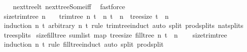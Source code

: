 \begin{isabellebody}
%
\isadelimproof
\ \ %
\endisadelimproof
%
\isatagproof
{}\isamarkupfalse%
\ next{\isacharunderscore}{\kern0pt}tree{\isacharunderscore}{\kern0pt}lt\ next{\isacharunderscore}{\kern0pt}tree{\isacharunderscore}{\kern0pt}Some{\isacharunderscore}{\kern0pt}iff\ \isamarkupfalse%
\ fastforce%
\endisatagproof
{\isafoldproof}%
%
\isadelimproof
%
\endisadelimproof
%
\isadelimdocument
%
\endisadelimdocument
%
\isatagdocument
%
\isamarkuptrue%
%
\endisatagdocument
{\isafolddocument}%
%
\isadelimdocument
%
\endisadelimdocument
{}\isamarkupfalse%
\ size{\isacharunderscore}{\kern0pt}trim{\isacharunderscore}{\kern0pt}tree{\isacharcolon}{\kern0pt}\ {\isachardoublequoteopen}n\ {\isasymnoteq}\ {}\ {\isasymLongrightarrow}\ trim{\isacharunderscore}{\kern0pt}tree\ n\ t\ {\isacharequal}{\kern0pt}\ {\isacharparenleft}{\kern0pt}n{\isacharprime}{\kern0pt}{\isacharcomma}{\kern0pt}\ t{\isacharprime}{\kern0pt}{\isacharparenright}{\kern0pt}\ {\isasymLongrightarrow}\ n{\isacharprime}{\kern0pt}\ {\isacharplus}{\kern0pt}\ tree{\isacharunderscore}{\kern0pt}size\ t{\isacharprime}{\kern0pt}\ {\isacharequal}{\kern0pt}\ n{\isachardoublequoteclose}\isanewline
%
\isadelimproof
\ \ %
\endisadelimproof
%
\isatagproof
{}\isamarkupfalse%
\ {\isacharparenleft}{\kern0pt}induction\ n\ t\ arbitrary{\isacharcolon}{\kern0pt}\ n{\isacharprime}{\kern0pt}\ t{\isacharprime}{\kern0pt}\ rule{\isacharcolon}{\kern0pt}\ trim{\isacharunderscore}{\kern0pt}tree{\isachardot}{\kern0pt}induct{\isacharparenright}{\kern0pt}\ {\isacharparenleft}{\kern0pt}auto\ split{\isacharcolon}{\kern0pt}\ prod{\isachardot}{\kern0pt}splits\ nat{\isachardot}{\kern0pt}splits\ tree{\isachardot}{\kern0pt}splits{\isacharparenright}{\kern0pt}%
\endisatagproof
{\isafoldproof}%
%
\isadelimproof
\isanewline
%
\endisadelimproof
\isanewline
{}\isamarkupfalse%
\ size{\isacharunderscore}{\kern0pt}fill{\isacharunderscore}{\kern0pt}tree{\isacharcolon}{\kern0pt}\ {\isachardoublequoteopen}sum{\isacharunderscore}{\kern0pt}list\ {\isacharparenleft}{\kern0pt}map\ tree{\isacharunderscore}{\kern0pt}size\ {\isacharparenleft}{\kern0pt}fill{\isacharunderscore}{\kern0pt}tree\ n\ t{\isacharparenright}{\kern0pt}{\isacharparenright}{\kern0pt}\ {\isacharequal}{\kern0pt}\ n{\isachardoublequoteclose}\isanewline
%
\isadelimproof
\ \ %
\endisadelimproof
%
\isatagproof
{}\isamarkupfalse%
\ size{\isacharunderscore}{\kern0pt}trim{\isacharunderscore}{\kern0pt}tree\ \isamarkupfalse%
\ {\isacharparenleft}{\kern0pt}induction\ n\ t\ rule{\isacharcolon}{\kern0pt}\ fill{\isacharunderscore}{\kern0pt}tree{\isachardot}{\kern0pt}induct{\isacharparenright}{\kern0pt}\ {\isacharparenleft}{\kern0pt}auto\ split{\isacharcolon}{\kern0pt}\ prod{\isachardot}{\kern0pt}split{\isacharparenright}{\kern0pt}%

\end{isabellebody}
